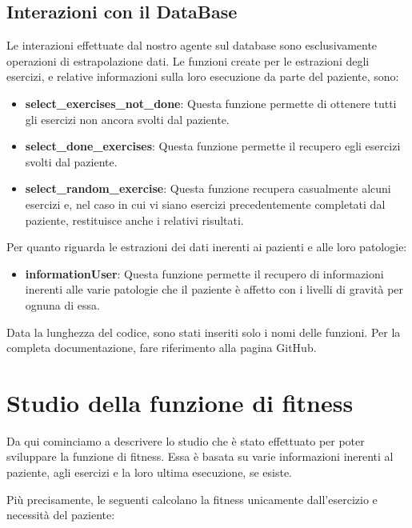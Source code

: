 \documentclass{article}
\begin{document}
\pagebreak

    \subsection{Interazioni con il DataBase}
    Le interazioni effettuate dal nostro agente sul database sono esclusivamente operazioni di estrapolazione dati. Le funzioni create per le estrazioni degli esercizi, e relative informazioni sulla loro esecuzione da parte del paziente, sono:
    \begin{itemize}
        \item\textbf{select\_exercises\_not\_done}: Questa funzione permette di ottenere tutti gli esercizi non ancora svolti dal paziente.

        \item\textbf{select\_done\_exercises}: Questa funzione permette il recupero egli esercizi svolti dal paziente.

        \item\textbf{select\_random\_exercise}: Questa funzione recupera casualmente alcuni esercizi e, nel caso in cui vi siano esercizi precedentemente completati dal paziente, restituisce anche i relativi risultati.

    \end{itemize}
    Per quanto riguarda le estrazioni dei dati inerenti ai pazienti e alle loro patologie:
    \begin{itemize}
        \item\textbf{informationUser}: Questa funzione permette il recupero di informazioni inerenti alle varie patologie che il paziente è affetto con i livelli di gravità per ognuna di essa.

    \end{itemize}

    Data la lunghezza del codice, sono stati inseriti solo i nomi delle funzioni. Per la completa documentazione, fare riferimento alla pagina GitHub.

\pagebreak

    \section{Studio della funzione di fitness}
    Da qui cominciamo a descrivere lo studio che è stato effettuato per poter sviluppare la funzione di fitness. Essa è basata su varie informazioni inerenti al paziente, agli esercizi e la loro ultima esecuzione, se esiste.

    Più precisamente, le seguenti calcolano la fitness unicamente dall'esercizio e necessità del paziente:
\end{document}
